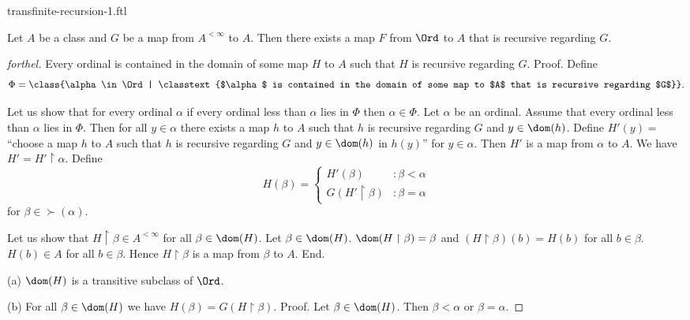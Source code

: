 \documentclass{naproche-library}
\begin{document}
\begin{smodule}[title=Transfinite Recursion I]{transfinite-recursion-1.ftl}
  
\begin{theorem}[forthel,title=Transfinite Recursion Theorem: Existence,id=transfinite-recursion_existence]
  Let $A$ be a class and $G$ be a map from $A^{< \infty}$ to $A$.
  Then there exists a map $F$ from $\Ord$ to $A$ that is recursive regarding $G$.
\end{theorem}
\begin{proof}[forthel]
  Every ordinal is contained in the domain of some map $H$ to $A$ such that $H$ is recursive regarding $G$. \newline
  Proof.
    Define \[ \Phi = \class{\alpha \in \Ord | \classtext{$\alpha$ is contained in the domain of some map to $A$ that is recursive regarding $G$}}. \]

    Let us show that for every ordinal $\alpha$ if every ordinal less than $\alpha$ lies in $\Phi$ then $\alpha \in \Phi$.
      Let $\alpha$ be an ordinal.
      Assume that every ordinal less than $\alpha$ lies in $\Phi$.
      Then for all $y \in \alpha$ there exists a map $h$ to $A$ such that $h$ is recursive regarding $G$ and $y \in \dom(h)$.
      Define $H'(y) =$ ``choose a map $h$ to $A$ such that $h$ is recursive regarding $G$ and $y \in \dom(h)$ in $h(y)$'' for $y \in \alpha$.
      Then $H'$ is a map from $\alpha$ to $A$.
      We have $H' = H' \restriction \alpha$.
      Define \[ H(\beta) =
        \begin{cases}
          H'(\beta)                 & : \beta < \alpha \\
          G(H' \restriction \beta)  & : \beta = \alpha
        \end{cases} \]
      for $\beta \in \succ(\alpha)$.
      
      Let us show that $H \restriction \beta \in A^{< \infty}$ for all $\beta \in \dom(H)$.
        Let $\beta \in \dom(H)$.
        $\dom(H \restriction \beta) = \beta$ and $(H \restriction \beta)(b) = H(b)$ for all $b \in \beta$.
        $H(b) \in A$ for all $b \in \beta$.
        Hence $H \restriction \beta$ is a map from $\beta$ to $A$.
      End.

      (a) $\dom(H)$ is a transitive subclass of $\Ord$.

      (b) For all $\beta \in \dom(H)$ we have $H(\beta) = G(H \restriction \beta)$. \newline
      Proof.
        Let $\beta \in \dom(H)$.
        Then $\beta < \alpha$ or $\beta = \alpha$.


\end{proof}
\end{smodule}
\end{document}
